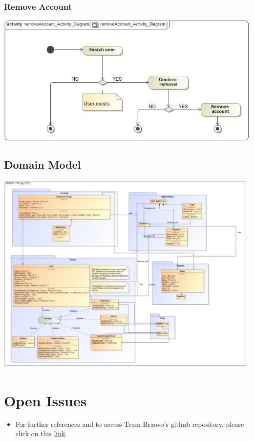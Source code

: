 \documentclass[11pt]{article}
\begin{document}
	\subsubsection{Remove Account}
	\begin{center}
		\includegraphics[width=\textwidth]{../Diagrams/ActivityDiagrams/removeAccount_Activity_Diagram.png}\\[0.5cm]
	\end{center}
	
	\newpage
	\subsection{Domain Model}
	\begin{center}
		\includegraphics[width=\textwidth]{../Diagrams/DomainModel/Model.png}\\[0.5cm]
	\end{center}
	
	\newpage
	\section{Open Issues}
	\begin{itemize}
		\item For further references and to access Team Braovo's github repository, please click on this \href{https://github.com/ish1993/Bravo}{link}.
		\end{itemize}
		
	\newpage
	
	{}
	
\end{document}
